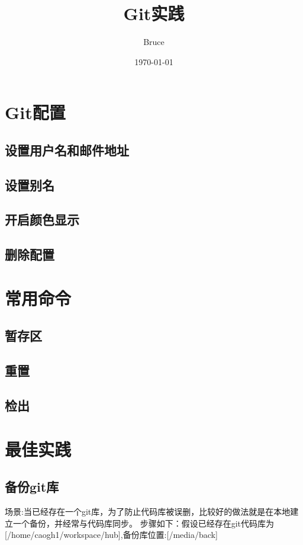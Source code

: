 \documentclass{article}
\title{Git实践}
\author{Bruce}
\date{\today}
\begin{document}
\maketitle
\tableofcontents

\newpage


\section{Git配置}
\subsection{设置用户名和邮件地址}

\subsection{设置别名}

\subsection{开启颜色显示}

\subsection{删除配置}
 
\section{常用命令}

\subsection{暂存区}

\subsection{重置}

\subsection{检出}

\section{最佳实践}

\subsection{备份git库}
场景:当已经存在一个git库，为了防止代码库被误删，比较好的做法就是在本地建立一个备份，并经常与代码库同步。
步骤如下：假设已经存在git代码库为[/home/caogh1/workspace/hub],备份库位置:[/media/back]
\end{document}
